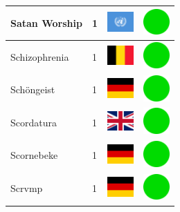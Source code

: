 \documentclass[12pt, a4paper, twoside]{report}
\begin{document}
\begin{center}
\begin{longtable}{|p{5cm}|p{2cm}|p{2cm}|p{2cm}|}
			Satan Worship & 1 & \includegraphics[width=1cm]{4x3/un} & \includegraphics[width=1cm]{likes/y} \\ \hline
			Schizophrenia & 1 & \includegraphics[width=1cm]{4x3/be} & \includegraphics[width=1cm]{likes/y} \\ \hline
			Schöngeist & 1 & \includegraphics[width=1cm]{4x3/de} & \includegraphics[width=1cm]{likes/y} \\ \hline
			Scordatura & 1 & \includegraphics[width=1cm]{4x3/gb} & \includegraphics[width=1cm]{likes/y} \\ \hline
			Scornebeke & 1 & \includegraphics[width=1cm]{4x3/de} & \includegraphics[width=1cm]{likes/y} \\ \hline
			Scrvmp & 1 & \includegraphics[width=1cm]{4x3/de} & \includegraphics[width=1cm]{likes/y} \\ \hline

\end{longtable}
\end{center}
\end{document}
